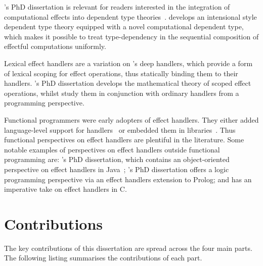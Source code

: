 \documentclass[12pt,phd,lfcs,twoside,openright,logo,leftchapter,normalheadings]{infthesis}
\theoremstyle{plain}
\theoremstyle{definition}
\begin{document}
\citeauthor{Ahman17}'s PhD dissertation is relevant for readers
interested in the integration of computational effects into dependent
type theories~\cite{Ahman17}. \citeauthor{Ahman17} develops an
intensional \citet{MartinLof84} style dependent type theory equipped
with a novel computational dependent type, which makes it possible to
treat type-dependency in the sequential composition of effectful
computations uniformly.

Lexical effect handlers are a variation on \citeauthor{PlotkinP09}'s
deep handlers, which provide a form of lexical scoping for effect
operations, thus statically binding them to their handlers.
%
\citeauthor{Geron19}'s PhD dissertation develops the mathematical
theory of scoped effect operations, whilst \citet{BiernackiPPS20}
study them in conjunction with ordinary handlers from a programming
perspective.


Functional programmers were early adopters of effect handlers. They
either added language-level support for handlers~
\cite{Hillerstrom15,DolanWSYM15,BiernackiPPS18,Leijen17,BauerP15,BrachthauserSO20a,LindleyMM17,Chiusano20}
or embedded them in
libraries~\cite{KiselyovSS13,KiselyovI15,KiselyovS16,KammarLO13,BrachthauserS17,Brady13,XieL20}. Thus
functional perspectives on effect handlers are plentiful in the
literature. Some notable examples of perspectives on effect handlers
outside functional programming are: \citeauthor{Brachthauser20}'s PhD
dissertation, which contains an object-oriented perspective on effect
handlers in Java~\cite{Brachthauser20}; \citeauthor{Saleh19}'s PhD
dissertation offers a logic programming perspective via an effect
handlers extension to Prolog; and \citet{Leijen17b} has an imperative
take on effect handlers in C.

\section{Contributions}
The key contributions of this dissertation are spread across the four
main parts. The following listing summarises the contributions of each
part.
\end{document}

